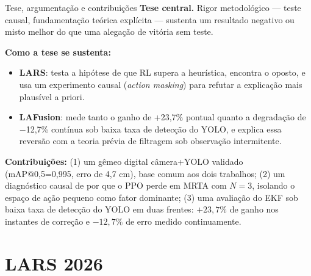 \documentclass[aspectratio=169]{beamer}
\begin{document}
\begin{frame}{Tese, argumentação e contribuições}
\small
\textbf{Tese central.} Rigor metodológico — teste causal, fundamentação teórica explícita — sustenta um resultado negativo ou misto melhor do que uma alegação de vitória sem teste.

\vspace{0.2cm}
\textbf{Como a tese se sustenta:}
\begin{itemize}
\item \textbf{LARS}: testa a hipótese de que RL supera a heurística, encontra o oposto, e usa um experimento causal (\emph{action masking}) para refutar a explicação mais plausível a priori.
\item \textbf{LAFusion}: mede tanto o ganho de +23,7\% pontual quanto a degradação de $-$12,7\% contínua sob baixa taxa de detecção do YOLO, e explica essa reversão com a teoria prévia de filtragem sob observação intermitente.
\end{itemize}

\vspace{0.2cm}
\textbf{Contribuições:} (1) um gêmeo digital câmera+YOLO validado (mAP@0,5=0,995, erro de 4,7 cm), base comum aos dois trabalhos; (2) um diagnóstico causal de por que o PPO perde em MRTA com $N=3$, isolando o espaço de ação pequeno como fator dominante; (3) uma avaliação do EKF sob baixa taxa de detecção do YOLO em duas frentes: $+23,7\%$ de ganho nos instantes de correção e $-12,7\%$ de erro medido continuamente.
\end{frame}

\section{LARS 2026}
\end{document}
